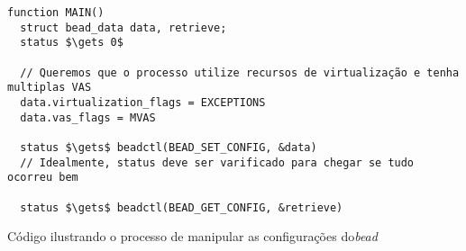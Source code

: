\begin{pseudocode}

\begin{lstlisting}[language=pseudocode, style=pseudocode]
function MAIN()
  struct bead_data data, retrieve;
  status $\gets 0$

  // Queremos que o processo utilize recursos de virtualização e tenha multiplas VAS
  data.virtualization_flags = EXCEPTIONS
  data.vas_flags = MVAS

  status $\gets$ beadctl(BEAD_SET_CONFIG, &data)
  // Idealmente, status deve ser varificado para chegar se tudo ocorreu bem

  status $\gets$ beadctl(BEAD_GET_CONFIG, &retrieve)

\end{lstlisting}

  \caption{Código ilustrando o processo de manipular as configurações  do\emph{bead}}
  \label{alg:exconfig}
\end{pseudocode}
